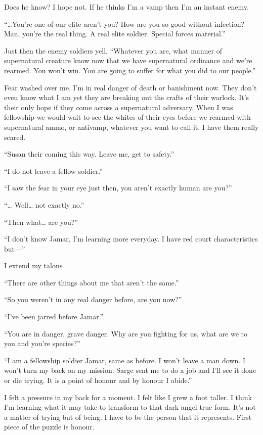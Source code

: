 Does he know? I hope not. If he thinks I'm a vamp then I'm an instant enemy.

``\dots{}You're one of our elite aren't you? How are you so good without infection? Man, you're the real thing. A real elite soldier. Special forces material.''

Just then the enemy soldiers yell, ``Whatever you are, what manner of supernatural creature know now that we have supernatural ordinance and we're rearmed. You won't win. You are going to suffer for what you did to our people.''

Fear washed over me. I'm in real danger of death or banishment now. They don't even know what I am yet they are breaking out the crafts of their warlock. It's their only hope if they come across a supernatural adversary. When I was fellowship we would wait to see the whites of their eyes before we rearmed with supernatural ammo, or antivamp, whatever you want to call it. I have them really scared.

``Susan their coming this way. Leave me, get to safety.''

``I do not leave a fellow soldier.''

``I saw the fear in your eye just then, you aren't exactly human are you?''

``\dots{} Well\dots{} not exactly no.''

``Then what\dots{} are you?''

``I don't know Jamar, I'm learning more everyday. I have red court characteristics but---''

I extend my talons

``There are other things about me that aren't the same.''

``So you weren't in any real danger before, are you now?''

``I've been jarred before Jamar.''

``You are in danger, grave danger. Why are you fighting for us, what are we to you and you're species?''

``I am a fellowship soldier Jamar, same as before. I won't leave a man down. I won't turn my back on my mission. Sarge sent me to do a job and I'll see it done or die trying. It is a point of honour and by honour I abide.''

I felt a pressure in my back for a moment. I felt like I grew a foot taller. I think I'm learning what it may take to transform to that dark angel true form. It's not a matter of trying but of being. I have to be the person that it represents. First piece of the puzzle is honour.

